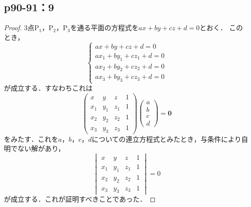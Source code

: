 \documentclass[uplatex,dvipdfmx,a4paper,10pt,fleqn]{jsarticle}
\begin{document}
\newpage 

\subsection*{p90-91：9}

\begin{tleftbar}
    \begin{proof}
    3点$\mathrm{P}_1$，$\mathrm{P_2}$，$\mathrm{P_3}$を通る平面の方程式を$ax+by+cz+d=0$とおく．
    このとき，
    \[
        \begin{cases}
            ax+by+cz + d =0 \\
            ax_1 + by_1 +cz_1 +d =0 \\
            ax_2 + by_2 +cz_2 +d =0 \\
            ax_3 + by_3 +cz_3 +d =0
        \end{cases}
    \]
    が成立する．すなわちこれは
    \[
        \begin{pmatrix} 
            x & y & z & 1 \\
            x_1 & y_1 & z_1& 1 \\
            x_2 & y_2 &z_2 & 1 \\
            x_3 & y_3 &z_3 & 1 
        \end{pmatrix}
        \begin{pmatrix}
            a \\
            b \\
            c \\
            d 
        \end{pmatrix}
        = \bm{0}
    \]
    をみたす．これを$a$，$b$，$c$，$d$についての連立方程式とみたとき，与条件により自明でない解があり，
    \[
    \begin{vmatrix} 
        x & y & z & 1 \\
        x_1 & y_1 & z_1& 1 \\
        x_2 & y_2 &z_2 & 1 \\
        x_3 & y_3 &z_3 & 1 
    \end{vmatrix}
    =0
    \]
    が成立する．これが証明すべきことであった．
\end{proof}
\end{tleftbar}
\end{document}
